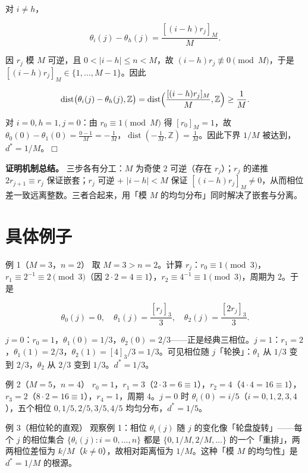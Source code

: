 \documentclass[a4paper,11pt,openany]{ctexbook}
\numberwithin{equation}{chapter}
\numberwithin{figure}{chapter}
\numberwithin{table}{chapter}
\begin{document}
对 $i\neq h$，

$$\theta_i(j)-\theta_h(j)=\frac{[(i-h)r_j]_M}{M}.$$

因 $r_j$ 模 $M$ 可逆，且 $0<|i-h|\le n<M$，故 $(i-h)r_j\not\equiv0\pmod M$，于是 $[(i-h)r_j]_M\in\{1,\dots,M-1\}$。因此

$$\operatorname{dist}\bigl(\theta_i(j)-\theta_h(j),\mathbb Z\bigr)=\operatorname{dist}\Bigl(\frac{[(i-h)r_j]_M}{M},\mathbb Z\Bigr)\ge\frac1M .$$

对 $i=0,h=1,j=0$：由 $r_0\equiv1\pmod M$ 得 $[r_0]_M=1$，故 $\theta_0(0)-\theta_1(0)=\frac{0-1}{M}=-\frac1M$，$\operatorname{dist}(-\frac1M,\mathbb Z)=\frac1M$。因此下界 $1/M$ 被达到，$d^*=1/M$。$\Box$

\textbf{证明机制总结。} 三步各有分工：$M$ 为奇使 $2$ 可逆（存在 $r_j$）；$r_j$ 的递推 $2r_{j+1}\equiv r_j$ 保证嵌套；$r_j$ 可逆 + $|i-h|<M$ 保证 $[(i-h)r_j]_M\neq0$，从而相位差一致远离整数。三者合起来，用「模 $M$ 的均匀分布」同时解决了嵌套与分离。

\section{具体例子}

\begin{examplebox}{例 1（$M=3$，$n=2$）}
取 $M=3>n=2$。计算 $r_j$：$r_0\equiv1\pmod3$，$r_1\equiv2^{-1}\equiv2\pmod3$（因 $2\cdot2=4\equiv1$），$r_2\equiv4^{-1}\equiv1\pmod3$，周期为 $2$。于是
\end{examplebox}

$$\theta_0(j)=0,\quad \theta_1(j)=\frac{[r_j]_3}{3},\quad \theta_2(j)=\frac{[2r_j]_3}{3}.$$

$j=0$：$r_0=1$，$\theta_1(0)=1/3$，$\theta_2(0)=2/3$——正是经典三相位。$j=1$：$r_1=2$，$\theta_1(1)=2/3$，$\theta_2(1)=[4]_3/3=1/3$。可见相位随 $j$「轮换」：$\theta_1$ 从 $1/3$ 变到 $2/3$，$\theta_2$ 从 $2/3$ 变到 $1/3$。$d^*=1/3$。

\begin{examplebox}{例 2（$M=5$，$n=4$）}
$r_0=1$，$r_1=3$（$2\cdot3=6\equiv1$），$r_2=4$（$4\cdot4=16\equiv1$），$r_3=2$（$8\cdot2=16\equiv1$），$r_4=1$，周期 $4$。$j=0$ 时 $\theta_i(0)=i/5$（$i=0,1,2,3,4$），五个相位 $0,1/5,2/5,3/5,4/5$ 均匀分布，$d^*=1/5$。
\end{examplebox}

\begin{examplebox}{例 3（相位轮的直观）}
观察例 1：相位 $\theta_i(j)$ 随 $j$ 的变化像「轮盘旋转」——每个 $j$ 的相位集合 $\{\theta_i(j):i=0,\dots,n\}$ 都是 $\{0,1/M,2/M,\dots\}$ 的一个「重排」，两两相位差恒为 $k/M$（$k\neq0$），故相对距离恒为 $1/M$。这种「模 $M$ 的均匀性」是 $d^*=1/M$ 的根源。
\end{examplebox}
\end{document}
